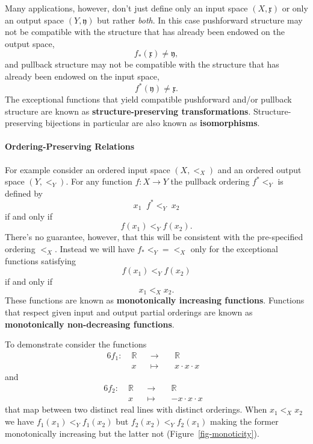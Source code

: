 \documentclass[
  letterpaper,
  DIV=11,
  numbers=noendperiod]{scrartcl}
\let\oldparagraph\paragraph
\renewcommand{\paragraph}[1]{\oldparagraph{#1}\mbox{}}
\begin{document}
Many applications, however, don't just define only an input space
\((X, \mathfrak{x})\) or only an output space \((Y, \mathfrak{y})\) but
rather \emph{both}. In this case pushforward structure may not be
compatible with the structure that has already been endowed on the
output space, \[
f_{*}(\mathfrak{x}) \ne \mathfrak{y},
\] and pullback structure may not be compatible with the structure that
has already been endowed on the input space, \[
f^{*}(\mathfrak{y}) \ne \mathfrak{x}.
\] The exceptional functions that yield compatible pushforward and/or
pullback structure are known as \textbf{structure-preserving
transformations}. Structure-preserving bijections in particular are also
known as \textbf{isomorphisms}.

\hypertarget{ordering-preserving-relations}{%
\paragraph{Ordering-Preserving
Relations}\label{ordering-preserving-relations}}

For example consider an ordered input space \((X, <_{X})\) and an
ordered output space \((Y, <_{Y})\). For any function
\(f: X \rightarrow Y\) the pullback ordering \(f^{*} \!\! <_{Y}\) is
defined by \[
x_{1} \;\; f^{*}\!\!<_{Y} \; x_{2}
\] if and only if \[
f(x_{1}) <_{Y} f(x_{2}).
\] There's no guarantee, however, that this will be consistent with the
pre-specified ordering \(<_{X}\). Instead we will have
\(f_{*} <_{Y} = <_{X}\) only for the exceptional functions satisfying \[
f(x_{1}) <_{Y} f(x_{2})
\] if and only if \[
x_{1} <_{X} x_{2}.
\] These functions are known as \textbf{monotonically increasing
functions}. Functions that respect given input and output partial
orderings are known as \textbf{monotonically non-decreasing functions}.

To demonstrate consider the functions \begin{alignat*}{6}
f_1 :\; & \mathbb{R} & &\rightarrow& \; & \mathbb{R} &
\\
& x & &\mapsto& & x \cdot x \cdot x &
\end{alignat*} and \begin{alignat*}{6}
f_2 :\; & \mathbb{R} & &\rightarrow& \; & \mathbb{R} &
\\
& x & &\mapsto& & - x \cdot x \cdot x &
\end{alignat*} that map between two distinct real lines with distinct
orderings. When \(x_{1} <_{X} x_{2}\) we have
\(f_1(x_{1}) <_{Y} f_1(x_{2})\) but \(f_2(x_{2}) <_{Y} f_2(x_{1})\)
making the former monotonically increasing but the latter not
(Figure~\ref{fig-monoticity}).
\end{document}
